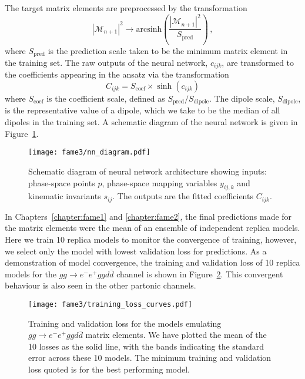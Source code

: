 \documentclass[main.tex]{subfiles}
\begin{document}
The target matrix elements are preprocessed by the transformation
\begin{equation}
    |\mathcal{M}_{n+1}|^{2} \rightarrow \mathrm{arcsinh}\left(\dfrac{|\mathcal{M}_{n+1}|^{2}}{S_{\mathrm{pred}}}\right) \, ,
    \label{eqn:pp_me_transform}
\end{equation}
where $S_{\mathrm{pred}}$ is the prediction scale taken to be the
minimum matrix element in the training set. The raw outputs of the
neural network, $c_{ijk}$, are transformed to the coefficients appearing
in the ansatz via the transformation
\begin{equation}
    C_{ijk} = S_{\mathrm{coef}} \times \sinh(c_{ijk})
    \label{eqn:pp_coefs_transform}
\end{equation}
where $S_{\mathrm{coef}}$ is the coefficient scale, defined
as $S_{\mathrm{pred}}/S_{\mathrm{dipole}}$. The dipole scale,
$S_{\mathrm{dipole}}$, is the representative value of a dipole,
which we take to be the median of all dipoles in the training set.
A schematic diagram of the neural network is given in Figure~\ref{fig:pp_nn}.

\begin{figure}
    \texttt{[image: fame3/nn\_diagram.pdf]}
    \caption{Schematic diagram of neural network architecture
     showing inputs: phase-space points $p$, phase-space mapping
     variables $y_{ij,k}$ and kinematic invariants $s_{ij}$.
     The outputs are the fitted coefficients $C_{ijk}$.}
    \label{fig:pp_nn}
\end{figure}

In Chapters~\ref{chapter:fame1} and \ref{chapter:fame2}, the final
predictions made for the matrix elements were the mean of an
ensemble of independent replica models.
Here we train 10 replica models to monitor the convergence of training,
however, we select only the model with lowest validation loss for
predictions. As a demonstration of model convergence, the training
and validation loss of 10 replica models for the
$gg \rightarrow e^{-}e^{+}ggd\bar{d}$ channel is shown in
Figure~\ref{fig:pp_loss_plot}. This convergent behaviour is
also seen in the other partonic channels.

\begin{figure}
    \texttt{[image: fame3/training\_loss\_curves.pdf]}
    \caption{Training and validation loss for the models emulating
    $gg \rightarrow e^{-}e^{+}ggd\bar{d}$ matrix elements. We have
    plotted the mean of the 10 losses as the solid line, with the bands
    indicating the standard error across these 10 models.
    The minimum training and validation loss quoted is for the best
    performing model.}
    \label{fig:pp_loss_plot}
\end{figure}
\end{document}
